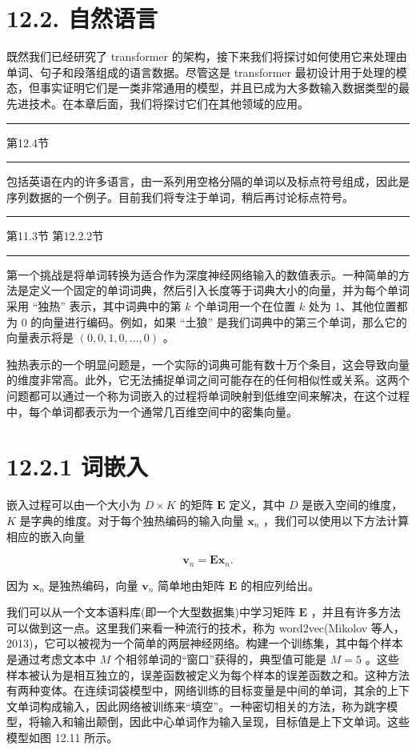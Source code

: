 \documentclass[10pt]{article}
\newcommand{\HRule}{\begin{center}\rule{0.9\linewidth}{0.2mm}\end{center}}
\begin{document}
\section*{12.2. 自然语言}

既然我们已经研究了 transformer 的架构，接下来我们将探讨如何使用它来处理由单词、句子和段落组成的语言数据。尽管这是 transformer 最初设计用于处理的模态，但事实证明它们是一类非常通用的模型，并且已成为大多数输入数据类型的最先进技术。在本章后面，我们将探讨它们在其他领域的应用。

\HRule

第12.4节

\HRule

包括英语在内的许多语言，由一系列用空格分隔的单词以及标点符号组成，因此是序列数据的一个例子。目前我们将专注于单词，稍后再讨论标点符号。

\HRule

第11.3节 第12.2.2节

\HRule

第一个挑战是将单词转换为适合作为深度神经网络输入的数值表示。一种简单的方法是定义一个固定的单词词典，然后引入长度等于词典大小的向量，并为每个单词采用 “独热” 表示，其中词典中的第 \(k\) 个单词用一个在位置 \(k\) 处为 1、其他位置都为 0 的向量进行编码。例如，如果 “土狼” 是我们词典中的第三个单词，那么它的向量表示将是 \(\left( {0,0,1,0,\ldots ,0}\right)\) 。

独热表示的一个明显问题是，一个实际的词典可能有数十万个条目，这会导致向量的维度非常高。此外，它无法捕捉单词之间可能存在的任何相似性或关系。这两个问题都可以通过一个称为词嵌入的过程将单词映射到低维空间来解决，在这个过程中，每个单词都表示为一个通常几百维空间中的密集向量。

\section*{12.2.1 词嵌入}

嵌入过程可以由一个大小为 \(D \times  K\) 的矩阵 \(\mathbf{E}\) 定义，其中 \(D\) 是嵌入空间的维度， \(K\) 是字典的维度。对于每个独热编码的输入向量 \({\mathbf{x}}_{n}\) ，我们可以使用以下方法计算相应的嵌入向量

\[
{\mathbf{v}}_{n} = \mathbf{E}{\mathbf{x}}_{n}. \tag{12.26}
\]

因为 \({\mathbf{x}}_{n}\) 是独热编码，向量 \({\mathbf{v}}_{n}\) 简单地由矩阵 \(\mathbf{E}\) 的相应列给出。

我们可以从一个文本语料库(即一个大型数据集)中学习矩阵 \(\mathbf{E}\) ，并且有许多方法可以做到这一点。这里我们来看一种流行的技术，称为 word2vec(Mikolov 等人，2013)，它可以被视为一个简单的两层神经网络。构建一个训练集，其中每个样本是通过考虑文本中 \(M\) 个相邻单词的“窗口”获得的，典型值可能是 \(M = 5\) 。这些样本被认为是相互独立的，误差函数被定义为每个样本的误差函数之和。这种方法有两种变体。在连续词袋模型中，网络训练的目标变量是中间的单词，其余的上下文单词构成输入，因此网络被训练来“填空”。一种密切相关的方法，称为跳字模型，将输入和输出颠倒，因此中心单词作为输入呈现，目标值是上下文单词。这些模型如图 12.11 所示。
\end{document}
